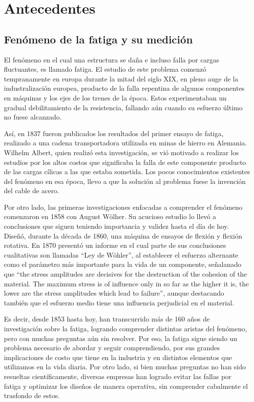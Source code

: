 \chapter{Antecedentes}

\section{Fenómeno de la fatiga y su medición}
El fenómeno en el cual una estructura se daña e incluso falla por cargas fluctuantes, es llamado fatiga. El estudio de este problema comenzó tempranamente en europa durante la mitad del siglo XIX, en pleno auge de la industralización europea, producto de la falla repentina de algunos componentes en máquinas y los ejes de los trenes de la época. Estos experimentaban un gradual debilitamiento de la resistencia, fallando aún cuando su esfuerzo último no fuese alcanzado. 

Así, en 1837 fueron publicados los resultados del primer ensayo de fatiga, realizado a una cadena transportadora utilizada en minas de hierro en Alemania. Wilhelm Albert, quien realizó esta investigación, se vió motivado a realizar los estudios por los altos costos que significaba la falla de este componente producto de las cargas cílicas a las que estaba sometida. Los pocos conocimientos existentes del fenómeno en esa época, llevo a que la solución al problema fuese la invención del cable de acero.

Por otro lado, las primeras investigaciones enfocadas a comprender el fenómeno comenzaron en 1858 con August Wölher. Su acucioso estudio lo llevó a conclusiones que siguen teniendo importancia y validez hasta el día de hoy. Diseñó, durante la década de 1860, una máquina de ensayos de flexión y flexión rotativa. En 1870 presentó un informe en el cual parte de sus conclusiones cualitativas son llamadas ``Ley de Wöhler'', al establecer el esfuerzo alternante como el parámetro más importante para la vida de un componente, señalanado que ``the stress amplitudes are decisives for the destruction of the cohesion of the material. The maximum stress is of influence only in so far as the higher it is, the lower are the stress amplitudes which lead to failure''\cite{schutz1996history}, aunque destacando también que el esfuerzo medio tiene una influencia perjudicial en el material. 

Es decir, desde 1853 hasta hoy, han transcurrido más de 160 años de investigación sobre la fatiga, logrando comprender distintas aristas del fenómeno, pero con muchas preguntas aún sin resolver. Por eso, la fatiga sigue siendo un problema necesario de abordar y seguir comprendiendo, por sus grandes implicaciones de costo que tiene en la industria y en distintos elementos que utilizamos en la vida diaria. Por otro lado, si bien muchas preguntas no han sido resueltas científicamente, diversas empresas han logrado evitar las fallas por fatiga y optimizar los diseños de manera operativa, sin comprender cabalmente el trasfondo de estos.

